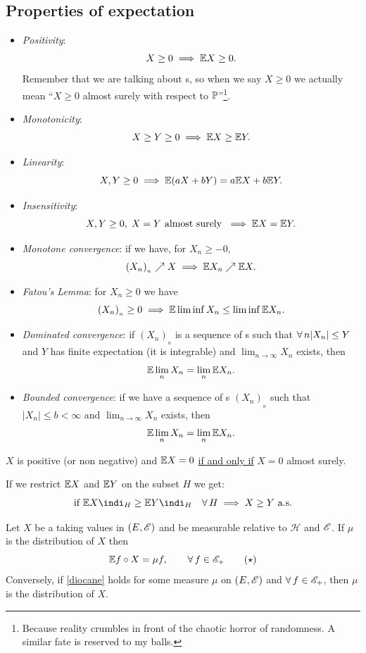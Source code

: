 \documentclass{report}
\begin{document}
\subsection{Properties of expectation}
\begin{itemize}
	\item \emph{Positivity}:
	\[X\geq0\implies\mathbb{E} X\geq0.\]
	Remember that we are talking about \rv s, so when we say $X\geq 0$ we actually mean ``$X\geq 0$ almost surely with respect to $\mathbb{P}$''\footnote{Because reality crumbles in front of the chaotic horror of randomness. A similar fate is reserved to my balls.}.
	\item \emph{Monotonicity}:
	\[X\geq Y\geq0\implies\mathbb{E} X\geq\mathbb{E} Y.\]
	\item \emph{Linearity}:
	\[X,Y\geq0\implies\mathbb{E}(aX+bY)=a\mathbb{E} X+b\mathbb{E} Y.\]
	\item \emph{Insensitivity}:
	\[X,Y\geq0,\; X=Y\text{ almost surely }\implies\mathbb{E} X=\mathbb{E} Y.\]
	\item \emph{Monotone convergence}: if we have, for $X_n\geq-0$,
	\[(X_{n})_{_{n}}\nearrow X\implies\mathbb{E} X_n\nearrow \mathbb{E} X.\]
	\item \emph{Fatou's Lemma}: for $X_n\geq0$ we have
	\[(X_{n})_{_{n}}\geq0\implies\mathbb{E}\liminf X_n\leq\liminf\mathbb{E} X_n.\]
	\item \emph{Dominated convergence}: if $(X_{n})_{_{n}}$ is a sequence of \rv s such that $\forall\, n |X_n|\leq Y$ and $Y$ has finite expectation (it is integrable) and $\lim_{n\to\infty}X_n$ exists, then 
	\[\mathbb{E}\lim_{n}X_n=\lim_{n}\mathbb{E} X_n.\]
	\item \emph{Bounded convergence}: if we have a sequence of \rv s $(X_n)_{_{n}}$ such that $|X_n|\leq b<\infty$ and $\lim_{n\to\infty}X_n$ exists, then
	\[\mathbb{E}\lim_{n}X_n=\lim_{n}\mathbb{E} X_n.\]
\end{itemize}
\begin{remark}
	$X$ is positive (or non negative) and $\mathbb{E} X=0$ \underline{if and only if} $X=0$ almost surely. 
\end{remark}
\begin{remark}
	If we restrict $\mathbb{E} X$ and $\mathbb{E} Y$ on the subset $H$ we get:
	\[\text{if }\ev X\indi_H\geq\ev Y\indi_H\quad\every H\implies X\geq Y\text{ a.s.}\]
\end{remark}
\begin{theorem}\label{expprob}
	Let $X$ be a \rv{} taking values in $(E,\mathscr{E})$ and be measurable relative to $\mathscr{H}$ and $\mathscr{E}$. If $\mu$ is the distribution of $X$ then
	\begin{equation}
		\mathbb{E} f\circ X=\mu f,\qquad\forall\, f\in\mathscr{E}_+ \tag{$\star$} \label{diocane}
	\end{equation}
	Conversely, if \ref{diocane} holds for some measure $\mu$ on $(E,\mathscr{E})$ and $\forall\, f\in\mathscr{E}_+$, then $\mu$ is the distribution of $X$.
\end{theorem}
\end{document}
